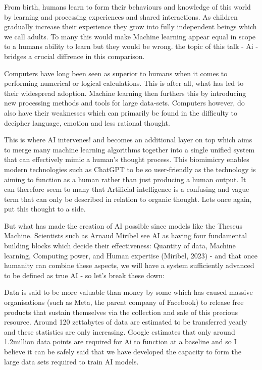 From birth, humans learn to form their behaviours and knowledge of this world by learning and processing experiences and shared interactions. As children gradually increase their experience they grow into fully independent beings which we call adults.
To many this would make Machine learning appear equal in scope to a humans ability to learn but they would be wrong. the topic of this talk - Ai - bridges a crucial diffrence in this comparison.

Computers have long been seen as superior to humans when it comes to performing numerical or logical calculations. This is after all, what has led to their widespread adoption. Machine learning then furthers this by introducing new processing methods and tools for large data-sets. Computers however, do also have their weaknesses which can primarily be found in the difficulty to decipher language, emotion and less rational thought.

This is where AI intervenes! and becomes an additional layer on top which aims to merge many machine learning algorithms together into a single unified system that can effectively mimic a human's thought process. This biomimicry enables modern technologies such as ChatGPT to be so user-friendly as the technology is aiming to function as a human rather than just producing a human output. It can therefore seem to many that Artificial intelligence is a confusing and vague term that can only be described in relation to organic thought. Lets once again, put this thought to a side.

But what has made the creation of AI possible since models like the Theseus Machine. Scientists such as Arnaud Miribel see AI as having four fundamental building blocks which decide their effectiveness: Quantity of data, Machine learning, Computing power, and Human expertise (Miribel, 2023) - and that once humanity can combine these aspects, we will have a system sufficiently advanced to be defined as true AI - so let's break these down:

Data is said to be more valuable than money by some which has caused massive organisations (such as Meta, the parent company of Facebook) to release free products that sustain themselves via the collection and sale of this precious resource. Around 120 zettabytes of data are estimated to be transferred yearly and these statistics are only increasing. Google estimates that only around 1.2million data points are required for Ai to function at a baseline and so I believe it can be safely said that we have developed the capacity to form the large data sets required to train AI models.


